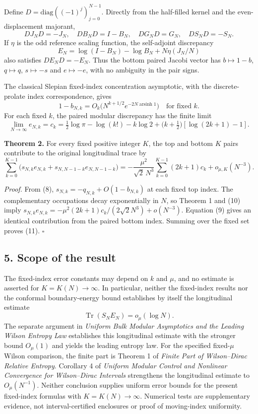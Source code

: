 \documentclass[
  10pt,
  a4paper,
]{article}
\begin{document}
Define \(D=\mathrm{diag}((-1)^j)_{j=0}^{N-1}\). Directly from the half-filled kernel and the even-displacement majorant, \[
DJ_ND=-J_N,\quad DB_ND=I-B_N,\quad DG_ND=G_N,
\quad DS_ND=-S_N.
\tag{9}
\] If \(\eta\) is the odd reference scaling function, the self-adjoint discrepancy \[
E_N=\log(I-B_N)-\log B_N+N\eta(J_N/N)
\] also satisfies \(DE_ND=-E_N\). Thus the bottom paired Jacobi vector has \(b\mapsto1-b\), \(q\mapsto q\), \(s\mapsto-s\) and \(e\mapsto-e\), with no ambiguity in the pair signs.

The classical Slepian fixed-index concentration asymptotic, with the discrete-prolate index correspondence, gives \[
1-b_{N,k}=O_k\bigl(N^{k+1/2}e^{-2N\operatorname{arsinh}1}\bigr)
\quad\text{for fixed }k.
\] For each fixed \(k\), the paired modular discrepancy has the finite limit \[
\lim_{N\to\infty}e_{N,k}=c_k
=\tfrac12\log\pi-\log(k!)-k\log2
+\bigl(k+\tfrac12\bigr)[\log(2k+1)-1].
\tag{10}
\]

\textbf{Theorem 2.} For every fixed positive integer \(K\), the top and bottom \(K\) pairs contribute to the original longitudinal trace by \[
\boxed{
\sum_{k=0}^{K-1}
\bigl(s_{N,k}e_{N,k}+s_{N,N-1-k}e_{N,N-1-k}\bigr)
=-\frac{\mu^2}{\sqrt2\,N^3}
\sum_{k=0}^{K-1}(2k+1)c_k+o_{\mu,K}(N^{-3}).
}
\tag{11}
\]

\emph{Proof.} From (8), \(s_{N,k}=-q_{N,k}+O(1-b_{N,k})\) at each fixed top index. The complementary occupations decay exponentially in \(N\), so Theorem 1 and (10) imply \(s_{N,k}e_{N,k}=-\mu^2(2k+1)c_k/(2\sqrt2N^3)+o(N^{-3})\). Equation (9) gives an identical contribution from the paired bottom index. Summing over the fixed set proves (11). \(\square\)

\subsection{5. Scope of the result}\label{scope-of-the-result}

The fixed-index error constants may depend on \(k\) and \(\mu\), and no estimate is asserted for \(K=K(N)\to\infty\). In particular, neither the fixed-index results nor the conformal boundary-energy bound establishes by itself the longitudinal estimate \[
\operatorname{Tr}(S_NE_N)=o_\mu(\log N).
\] The separate argument in \emph{Uniform Bulk Modular Asymptotics and the Leading Wilson Entropy Law} establishes this longitudinal estimate with the stronger bound \(O_\mu(1)\) and yields the leading entropy law. For the specified fixed-\(\mu\) Wilson comparison, the finite part is Theorem 1 of \emph{Finite Part of Wilson--Dirac Relative Entropy}. Corollary 4 of \emph{Uniform Modular Control and Nonlinear Convergence for Wilson--Dirac Intervals} strengthens the longitudinal estimate to \(O_\mu(N^{-1})\). Neither conclusion supplies uniform error bounds for the present fixed-index formulas with \(K=K(N)\to\infty\). Numerical tests are supplementary evidence, not interval-certified enclosures or proof of moving-index uniformity.
\end{document}

